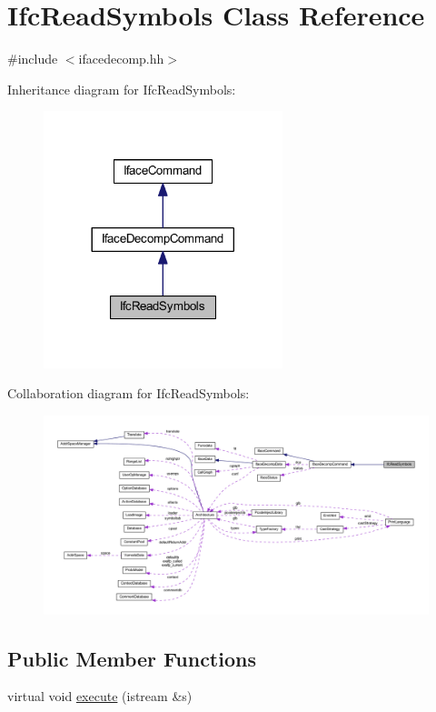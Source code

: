 \hypertarget{class_ifc_read_symbols}{}\section{Ifc\+Read\+Symbols Class Reference}
\label{class_ifc_read_symbols}


{\ttfamily \#include $<$ifacedecomp.\+hh$>$}



Inheritance diagram for Ifc\+Read\+Symbols\+:
\nopagebreak
\begin{figure}[H]
\begin{center}
\leavevmode
\includegraphics[width=197pt]{class_ifc_read_symbols__inherit__graph}
\end{center}
\end{figure}


Collaboration diagram for Ifc\+Read\+Symbols\+:
\nopagebreak
\begin{figure}[H]
\begin{center}
\leavevmode
\includegraphics[width=350pt]{class_ifc_read_symbols__coll__graph}
\end{center}
\end{figure}
\subsection*{Public Member Functions}
\begin{DoxyCompactItemize}
\item 
virtual void \mbox{\hyperlink{class_ifc_read_symbols_a5e0b66be5caec5f99dd8c11e31826e5a}{execute}} (istream \&s)
\end{DoxyCompactItemize}
